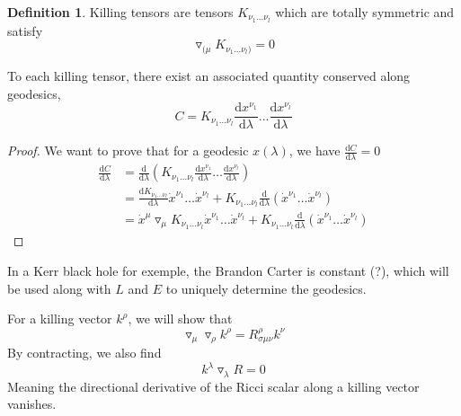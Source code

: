 \documentclass[a4paper]{book}
\theoremstyle{definition}
\newtheorem{definition}{Definition}[section]
\theoremstyle{remark}
\begin{document}
\begin{definition}
    Killing tensors are tensors $K_{\nu_1\dots \nu_l}$ which are totally symmetric and satisfy 
    \begin{equation}
        \triangledown_{(\mu} K_{\nu_1\dots \nu_l)} = 0
    \end{equation}
\end{definition}
To each killing tensor, there exist an associated quantity conserved along geodesics, 
\begin{equation}
    C = K_{\nu_1\dots \nu_l} \frac{\text{d}x^{\nu_1}}{\text{d}\lambda} \dots \frac{\text{d}x^{\nu_l}}{\text{d}\lambda}
\end{equation}
\begin{proof}
    We want to prove that for a geodesic $x(\lambda)$, we have $\frac{\text{d}C}{\text{d}\lambda} = 0$
    \begin{equation}
        \begin{aligned}
            \frac{\text{d}C}{\text{d}\lambda} &= \frac{\text{d}}{\text{d}\lambda}\left(K_{\nu_1\dots \nu_l} \frac{\text{d}x^{\nu_1}}{\text{d}\lambda} \dots \frac{\text{d}x^{\nu_l}}{\text{d}\lambda}\right) \\
            &= \frac{\text{d}K_{\nu_1\dots \nu_l}}{\text{d}\lambda} \dot{x}^{\nu_1}\dots \dot{x}^{\nu_l} + K_{\nu_1\dots \nu_l}\frac{\text{d}}{\text{d}\lambda}\left(\dot{x}^{\nu_1}\dots \dot{x}^{\nu_l}\right) \\
            &= \dot{x}^\mu\triangledown_\mu K_{\nu_1\dots \nu_l} \dot{x}^{\nu_1}\dots \dot{x}^{\nu_l} + K_{\nu_1\dots \nu_l}\frac{\text{d}}{\text{d}\lambda}\left(\dot{x}^{\nu_1}\dots \dot{x}^{\nu_l}\right) 
        \end{aligned}
    \end{equation}
\end{proof}
In a Kerr black hole for exemple, the Brandon Carter is constant (?), which will be used along with $L$ and $E$ to uniquely determine the geodesics. \par \medskip 

For a killing vector $k^\rho$, we will show that 
\begin{equation}
    \triangledown_\mu \triangledown_\rho k^\rho = R^\rho_{\sigma\mu\nu}k^\nu 
\end{equation}
By contracting, we also find 
\begin{equation}
    k^\lambda \triangledown_\lambda R = 0
\end{equation}
Meaning the directional derivative of the Ricci scalar along a killing vector vanishes. 
\end{document}
